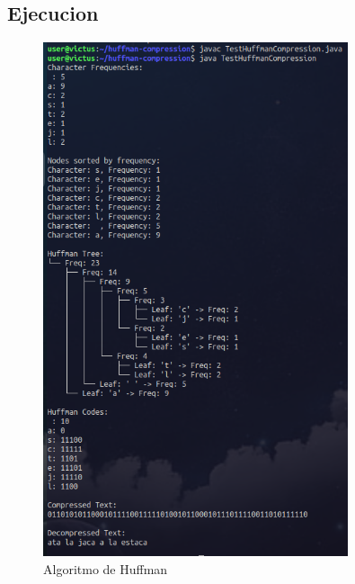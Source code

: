 \documentclass[10pt, a4paper]{article}
\begin{document}
\subsection{Ejecucion}
  \begin{figure}[H]
    \centering
    \includegraphics[width=0.8\textwidth]{img/E1.png}
    \caption{Algoritmo de Huffman}
  \end{figure}
\end{document}
